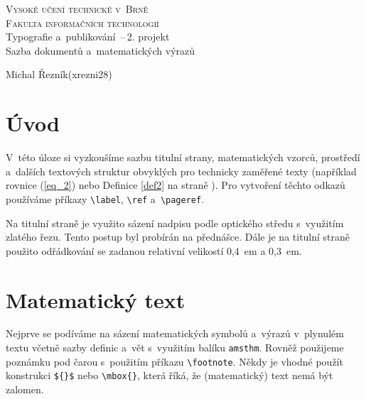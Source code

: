 \documentclass[a4paper, 11pt, twocolumn]{article}
\begin{document}
    \begin{titlepage}
		\begin{center}
			{\Huge\textsc{
			   	Vysoké učení technické v~Brně\\[0,4em]
            }}  
            {\huge\textsc{
                 Fakulta informačních technologií \\
			}}
			{\LARGE{
				Typografie a~publikování \,--\,2. projekt\\[0,3em]
				Sazba dokumentů a~matematických výrazů
			}}
		\end{center}

		{\Large
			\the\year
			\hfill
			Michal Řezník(xrezni28)
		}
	\end{titlepage}
	
	\section*{Úvod}
    	V~této úloze si vyzkoušíme sazbu titulní strany, matematic\-kých vzorců, prostředí a~dalších textových struktur obvyklých pro technicky zaměřené texty (například rovnice (\ref{eq_2}) nebo Definice \ref{def2}  na straně \pageref{def2}). Pro vytvoření těchto odkazů používáme příkazy \verb|\label|, \verb|\ref| a~\verb|\pageref|.
        
        Na titulní straně je využito sázení nadpisu podle optického středu s~využitím zlatého řezu. Tento postup byl probírán na přednášce. Dále je na titulní straně použito odřádkování se zadanou relativní velikostí 0,4~em a 0,3~em.

    \section{Matematický text}
        Nejprve se podíváme na sázení matematických symbolů a~výrazů v~plynulém textu včetně sazby definic a~vět s~využitím balíku \texttt{amsthm}. Rovněž použijeme poznámku pod čarou s~použitím příkazu \verb|\footnote|. Někdy je vhodné použít konstrukci \verb|${}$| nebo \verb|\mbox{}|, která říká, že (matematický) text nemá být zalomen. 
        
\end{document}
